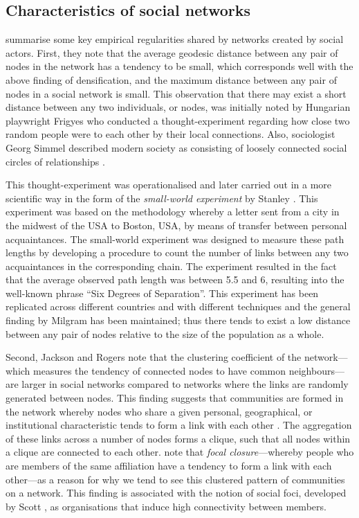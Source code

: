 \subsection{Characteristics of social networks}

\citet{JacksonRogers2007} summarise some key empirical regularities shared by networks created by social actors. First, they note that the average geodesic distance between any pair of nodes in the network has a tendency to be small, which corresponds well with the above finding of densification, and the maximum distance between any pair of nodes in a social network is small. This observation that there may exist a short distance between any two individuals, or nodes, was initially noted by Hungarian playwright Frigyes \citet{Karinthy1929} who conducted a thought-experiment regarding how close two random people were to each other by their local connections. Also, sociologist Georg Simmel described modern society as consisting of loosely connected social circles of relationships \citep{Simmel1950}.

This thought-experiment was operationalised and later carried out in a more scientific way in the form of the \emph{small-world experiment} by Stanley \citet{Milgram1967}. This experiment was based on the methodology whereby a letter sent from a city in the midwest of the USA to Boston, USA, by means of transfer between personal acquaintances. The small-world experiment was designed to measure these path lengths by developing a procedure to count the number of links between any two acquaintances in the corresponding chain. The experiment resulted in the fact that the average observed path length was between 5.5 and 6, resulting into the well-known phrase ``Six Degrees of Separation''. This experiment has been replicated across different countries and with different techniques and the general finding by Milgram has been maintained; thus there tends to exist a low distance between any pair of nodes relative to the size of the population as a whole.

Second, Jackson and Rogers note that the clustering coefficient of the network---which measures the tendency of connected nodes to have common neighbours---are larger in social networks compared to networks where the links are randomly generated between nodes. This finding suggests that communities are formed in the network whereby nodes who share a given personal, geographical, or institutional characteristic tends to form a link with each other \citep{Watts2002}. The aggregation of these links across a number of nodes forms a clique, such that all nodes within a clique are connected to each other. \citet{KossinetsWatts2006} note that \emph{focal closure}---whereby people who are members of the same affiliation have a tendency to form a link with each other---as a reason for why we tend to see this clustered pattern of communities on a network. This finding is associated with the notion of social foci, developed by Scott \citet{Feld1981, Feld1982}, as organisations that induce high connectivity between members.

